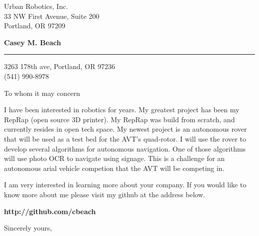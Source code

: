 \documentclass{letter} %
\begin{document}
\signature{Casey M. Beach}           %
\longindentation=0pt                       %
\let\raggedleft\raggedright                %
 
 
\begin{letter}{Urban Robotics, Inc. \\
33 NW First Avenue, Suite 200 \\
Portland, OR 97209 }

\begin{flushleft}
{\large\bf Casey M. Beach}
\end{flushleft}
\medskip\hrule height 1pt
\begin{flushright}
\hfill 3263 178th ave, Portland, OR 97236 \\
\hfill (541) 990-8978 
\end{flushright} 
\vfill %

 
\opening{To whom it may concern} 
\begin{flushleft} 
\noindent  I have been interested in robotics for years.  My greatest project has been my RepRap (open source 3D printer).  
My RepRap was build from scratch, and currently resides in open tech space.  My newest project is an autonomous rover that
will be used as a test bed for the AVT's quad-rotor.  I will use the rover to develop several algorithms for autonomous 
navigation.  One of those algorithms will use photo OCR to navigate using signage.  This is a challenge for an autonomous
arial vehicle competion that the AVT will be competing in.

I am very interested in learning more about your company.  If you would like to know more about me please visit my github
at the address below. \\ 
\end{flushleft}
\begin{center}
	\textbf{http://github.com/cbeach}
\end{center}


\closing{Sincerely yours,} 
 

 

\end{letter}
 
\end{document}
